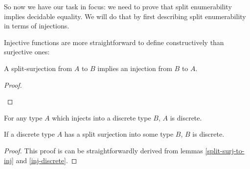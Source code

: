 So now we have our task in focus: we need to prove that split enumerability
implies decidable equality.
We will do that by first describing split enumerability in terms of injections.
\begin{definition}[Injections]
  Injective functions are more straightforward to define constructively than
  surjective ones:
  \begin{agdalisting}
  \end{agdalisting} \vspace{-1.5\baselineskip}
  \begin{agdalisting}
  \end{agdalisting}
\end{definition}
\begin{lemma} \label{split-surj-to-inj}
  A split-surjection from \(A\) to \(B\) implies an injection from \(B\) to
  \(A\).
  \begin{agdalisting}
  \end{agdalisting}
\end{lemma}
\begin{proof} \let\qed\relax

  \begin{minipage}[t]{.9\textwidth}\vspace{-\baselineskip}
    \begin{agdalisting*}
    \end{agdalisting*}
  \end{minipage}
\end{proof}
\begin{lemma} \label{inj-discrete}
  For any type \(A\) which injects into a discrete type \(B\), \(A\) is
  discrete.
  \begin{agdalisting}
  \end{agdalisting}
\end{lemma}

\begin{lemma} \label{discrete-surj}
  If a discrete type \(A\) has a split surjection into some type \(B\), \(B\) is
  discrete.
  \begin{agdalisting}
  \end{agdalisting}
\end{lemma}
\begin{proof}
  This proof is can be straightforwardly derived from lemmas
  \ref{split-surj-to-inj} and \ref{inj-discrete}.
\end{proof}

